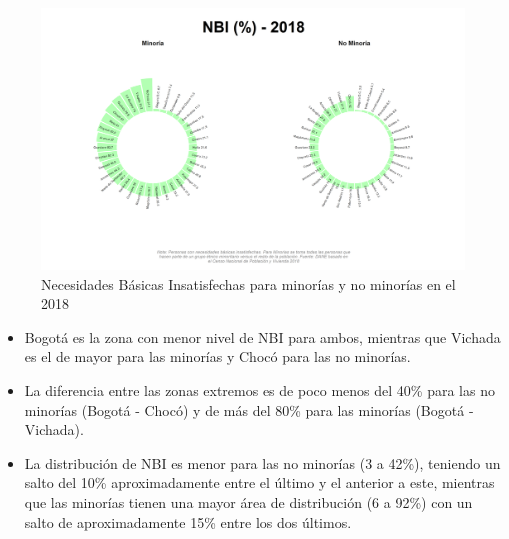     \begin{figure}[H]
        \caption{Necesidades Básicas Insatisfechas para minorías y no minorías en el 2018 \label{map_result_2} }
        \begin{center}
        \includegraphics[width=\textwidth,keepaspectratio]{img/var_272_static.png}
        \end{center}
    \end{figure}
            \begin{itemize}
                    \item Bogotá es la zona con menor nivel de NBI para ambos, mientras que Vichada es el de mayor para las minorías y Chocó para las no minorías.
                    \item La diferencia entre las zonas extremos es de poco menos del 40\% para las no minorías (Bogotá - Chocó) y de más del 80\% para las minorías (Bogotá - Vichada).
                    \item La distribución de NBI es menor para las no minorías (3 a 42\%), teniendo un salto del 10\% aproximadamente entre el último y el anterior a este, mientras que las minorías tienen una mayor área de distribución (6 a 92\%) con un salto de aproximadamente 15\% entre los dos últimos.
                    \end{itemize}

